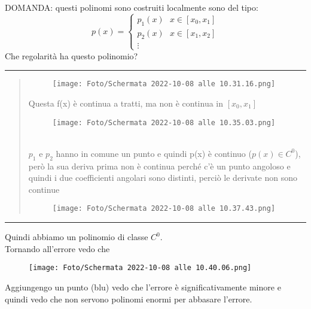 \documentclass[a4paper, portrait]{book}
\numberwithin{equation}{chapter} %
\newcommand*\sepline{%
  \begin{center}
    \rule[1ex]{.5\textwidth}{.5pt}
  \end{center}}
\begin{document}
DOMANDA: questi polinomi sono costruiti localmente sono del tipo:
\begin{equation}
    p(x) = \begin{cases}
        p_1(x) \ \ \ x \in [x_0, x_1]\\
        p_2(x) \ \ \ x \in [x_1,x_2]\\
        \vdots
    \end{cases}
\end{equation}
Che regolarità ha questo polinomio?
\sepline{}
\begin{quote}
    \begin{figure}[h!]
        \centering
        \texttt{[image: Foto/Schermata 2022-10-08 alle 10.31.16.png]}
        \caption{}
    \end{figure}
    Questa f(x) è continua a tratti, ma non è continua in $[x_0,x_1]$\\
    \begin{figure}[h!]
        \centering
        \texttt{[image: Foto/Schermata 2022-10-08 alle 10.35.03.png]}
        \caption{}
    \end{figure}\\
    $p_1$ e $p_2$ hanno in comune un punto e quindi p(x) è continuo ($p(x) \in C^0$), però la sua deriva prima non è continua perché c'è un punto angoloso e quindi i due coefficienti angolari sono distinti, perciò  le derivate non sono continue
    \begin{figure}
        \centering
        \texttt{[image: Foto/Schermata 2022-10-08 alle 10.37.43.png]}
        \caption{}
    \end{figure}
\end{quote}
\sepline{}
Quindi abbiamo un polinomio di classe $C^0$.\\
Tornando all'errore vedo che 
\begin{figure}[h!]
    \centering
    \texttt{[image: Foto/Schermata 2022-10-08 alle 10.40.06.png]}
    \caption{}
\end{figure}
Aggiungengo un punto (blu) vedo che l'errore è significativamente minore e quindi vedo che non servono polinomi enormi per abbasare l'errore.
\end{document}
